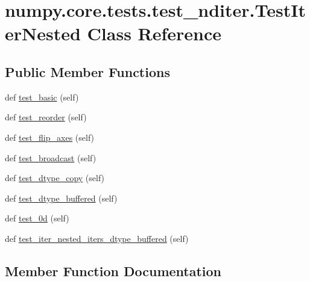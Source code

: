 \hypertarget{classnumpy_1_1core_1_1tests_1_1test__nditer_1_1TestIterNested}{}\section{numpy.\+core.\+tests.\+test\+\_\+nditer.\+Test\+Iter\+Nested Class Reference}
\label{classnumpy_1_1core_1_1tests_1_1test__nditer_1_1TestIterNested}
\subsection*{Public Member Functions}
\begin{DoxyCompactItemize}
\item 
def \hyperlink{classnumpy_1_1core_1_1tests_1_1test__nditer_1_1TestIterNested_adfe4e34eeb966caceb30a39ce40c59b5}{test\+\_\+basic} (self)
\item 
def \hyperlink{classnumpy_1_1core_1_1tests_1_1test__nditer_1_1TestIterNested_adee67d1c0f679b1ac91050f93f5e4e42}{test\+\_\+reorder} (self)
\item 
def \hyperlink{classnumpy_1_1core_1_1tests_1_1test__nditer_1_1TestIterNested_ae8ab869412d9d8fc390ff99d4f3e964f}{test\+\_\+flip\+\_\+axes} (self)
\item 
def \hyperlink{classnumpy_1_1core_1_1tests_1_1test__nditer_1_1TestIterNested_a1b841aac69102ad78ded850cf50081ec}{test\+\_\+broadcast} (self)
\item 
def \hyperlink{classnumpy_1_1core_1_1tests_1_1test__nditer_1_1TestIterNested_a852e66744317b05817ea5335b783f56c}{test\+\_\+dtype\+\_\+copy} (self)
\item 
def \hyperlink{classnumpy_1_1core_1_1tests_1_1test__nditer_1_1TestIterNested_aef37bde47edd418ebecf71c2acd1fb97}{test\+\_\+dtype\+\_\+buffered} (self)
\item 
def \hyperlink{classnumpy_1_1core_1_1tests_1_1test__nditer_1_1TestIterNested_a5dd3ed143ac2434eb3e747ccc0d15a93}{test\+\_\+0d} (self)
\item 
def \hyperlink{classnumpy_1_1core_1_1tests_1_1test__nditer_1_1TestIterNested_aede1272365595edc5325e3b5a98788e4}{test\+\_\+iter\+\_\+nested\+\_\+iters\+\_\+dtype\+\_\+buffered} (self)
\end{DoxyCompactItemize}


\subsection{Member Function Documentation}
\mbox{\label{classnumpy_1_1core_1_1tests_1_1test__nditer_1_1TestIterNested_a5dd3ed143ac2434eb3e747ccc0d15a93}} 
